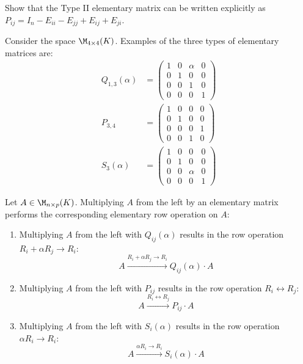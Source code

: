 \begin{exercise}
Show that the Type II elementary matrix can be written explicitly as $P_{ij} = I_n - E_{ii} - E_{jj} + E_{ij} + E_{ji}$.
\end{exercise}

\begin{example}
Consider the space $\M_{4 \times 4}(K)$. Examples of the three types of elementary matrices are:
\begin{align*}
    Q_{1,3}(\alpha) &= \begin{pmatrix} 1 & 0 & \alpha & 0 \\ 0 & 1 & 0 & 0 \\ 0 & 0 & 1 & 0 \\ 0 & 0 & 0 & 1 \end{pmatrix} \\
    P_{3,4} &= \begin{pmatrix} 1 & 0 & 0 & 0 \\ 0 & 1 & 0 & 0 \\ 0 & 0 & 0 & 1 \\ 0 & 0 & 1 & 0 \end{pmatrix} \\
    S_3(\alpha) &= \begin{pmatrix} 1 & 0 & 0 & 0 \\ 0 & 1 & 0 & 0 \\ 0 & 0 & \alpha & 0 \\ 0 & 0 & 0 & 1 \end{pmatrix}
\end{align*}
\end{example}

\begin{lemma}
\label{lemma:row_operations_matrix_multiplication}
Let $A \in \M_{n \times p}(K)$. Multiplying $A$ from the left by an elementary matrix performs the corresponding elementary row operation on $A$:
\begin{enumerate}
    \item Multiplying $A$ from the left with $Q_{ij}(\alpha)$ results in the row operation $R_i + \alpha R_j \longrightarrow R_i$:
    \begin{equation*}
        A \xrightarrow{R_i + \alpha R_j \longrightarrow R_i} Q_{ij}(\alpha) \cdot A
    \end{equation*}
    \item Multiplying $A$ from the left with $P_{ij}$ results in the row operation $R_i \leftrightarrow R_j$:
    \begin{equation*}
        A \xrightarrow{R_i \leftrightarrow R_j} P_{ij} \cdot A
    \end{equation*}
    \item Multiplying $A$ from the left with $S_i(\alpha)$ results in the row operation $\alpha R_i \longrightarrow R_i$:
    \begin{equation*}
        A \xrightarrow{\alpha R_i \longrightarrow R_i} S_i(\alpha) \cdot A
    \end{equation*}
\end{enumerate}
\end{lemma}

